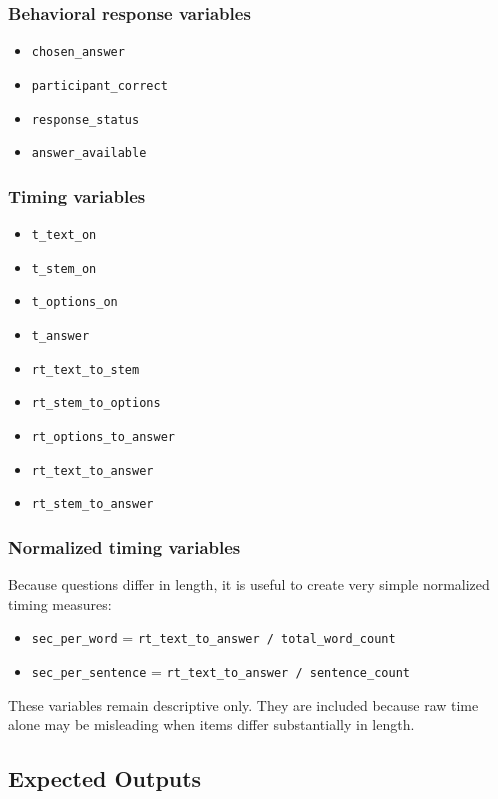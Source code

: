 \subsubsection*{Behavioral response variables}
\begin{itemize}
    \item \texttt{chosen\_answer}
    \item \texttt{participant\_correct}
    \item \texttt{response\_status}
    \item \texttt{answer\_available}
\end{itemize}

\subsubsection*{Timing variables}
\begin{itemize}
    \item \texttt{t\_text\_on}
    \item \texttt{t\_stem\_on}
    \item \texttt{t\_options\_on}
    \item \texttt{t\_answer}
    \item \texttt{rt\_text\_to\_stem}
    \item \texttt{rt\_stem\_to\_options}
    \item \texttt{rt\_options\_to\_answer}
    \item \texttt{rt\_text\_to\_answer}
    \item \texttt{rt\_stem\_to\_answer}
\end{itemize}

\subsubsection*{Normalized timing variables}
Because questions differ in length, it is useful to create very simple normalized timing measures:
\begin{itemize}
    \item \texttt{sec\_per\_word} = \texttt{rt\_text\_to\_answer / total\_word\_count}
    \item \texttt{sec\_per\_sentence} = \texttt{rt\_text\_to\_answer / sentence\_count}
\end{itemize}

These variables remain descriptive only.
They are included because raw time alone may be misleading when items differ substantially in length.

\subsection{Expected Outputs}

